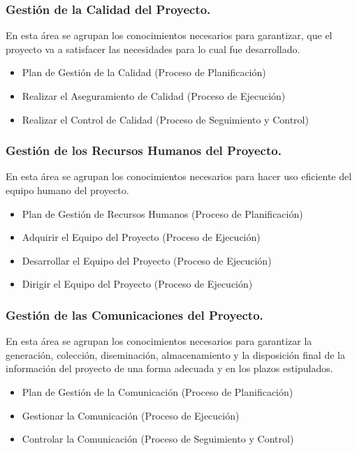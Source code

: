 \documentclass[12pt]{beamer}
\begin{document}
\begin{frame}
 \frametitle{Gestión de la Calidad del Proyecto.}
 En esta área se agrupan los conocimientos necesarios para garantizar, que el proyecto va a satisfacer las necesidades para lo cual fue desarrollado.
 \begin{itemize}
  \item<2-> Plan de Gestión de la Calidad (Proceso de Planificación)
  \item<3-> Realizar el Aseguramiento de Calidad (Proceso de Ejecución)
  \item<4-> Realizar el Control de Calidad (Proceso de Seguimiento y Control)
 \end{itemize}
\end{frame}



\begin{frame}
 \frametitle{Gestión de los Recursos Humanos del Proyecto.}
 En esta área se agrupan los conocimientos necesarios para hacer uso eficiente del equipo humano del proyecto.
 \begin{itemize}
  \item<2-> Plan de Gestión de Recursos Humanos (Proceso de Planificación)
  \item<3-> Adquirir el Equipo del Proyecto (Proceso de Ejecución) 
  \item<4-> Desarrollar el Equipo del Proyecto (Proceso de Ejecución)
  \item<5-> Dirigir el Equipo del Proyecto (Proceso de Ejecución)
 \end{itemize}
\end{frame}



\begin{frame}
 \frametitle{Gestión de las Comunicaciones del Proyecto.}
 En esta área se agrupan los conocimientos necesarios para garantizar la generación, colección, diseminación, almacenamiento y la disposición final de la información del proyecto de una forma adecuada y en los plazos estipulados.
 \begin{itemize}
  \item<2-> Plan de Gestión de la Comunicación (Proceso de Planificación)
  \item<3-> Gestionar la Comunicación (Proceso de Ejecución)
  \item<4-> Controlar la Comunicación (Proceso de Seguimiento y Control)
 \end{itemize}
\end{frame}
\end{document}
